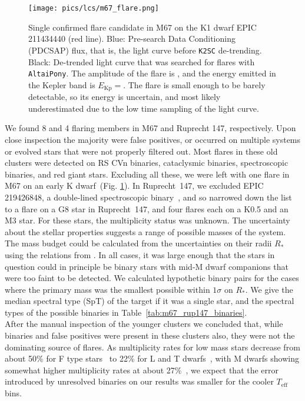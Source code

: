 \documentclass{aa}
\begin{document}
\begin{figure}[ht!]
    \centering
    \texttt{[image: pics/lcs/m67\_flare.png]}
    \caption{Single confirmed flare candidate in M67 on the K1 dwarf EPIC 211434440 (red line). Blue: Pre-search Data Conditioning (PDCSAP) flux, that is, the light curve before \texttt{K2SC} de-trending. Black: De-trended light curve that was searched for flares with \texttt{AltaiPony}. The amplitude of the flare is \unskip, and the energy emitted in the Kepler band is $E_\mathrm{Kp}=$. The flare is small enough to be barely detectable, so its energy is uncertain, and most likely underestimated due to the low time sampling of the light curve.}      
    \label{fig:m67}
\end{figure}
We found 8 and 4 flaring members in M67 and Ruprecht 147, respectively. Upon close inspection the majority were false positives, or occurred on multiple systems or evolved stars that were not properly filtered out. Most flares in these old clusters were detected on RS CVn binaries, cataclysmic binaries, spectroscopic binaries, and red giant stars. Excluding all these, we were left with one flare in M67 on an early K dwarf~(Fig. \ref{fig:m67}). In Ruprecht~147, we excluded EPIC 219426848, a double-lined spectroscopic binary~\citep{curtis2013}, and so narrowed down the list to a flare on a G8 star in Ruprecht~147, and four flares each on a K0.5 and an M3 star. For these stars, the multiplicity status was unknown. The uncertainty about the stellar properties suggests a range of possible masses of the system. The mass budget could be calculated from the uncertainties on their radii $R_*$ using the relations from \citet{eker2018}. In all cases, it was large enough that the stars in question could in principle be binary stars with mid-M dwarf companions that were too faint to be detected. We calculated hypothetic binary pairs for the cases where the primary mass was the smallest possible within $1\sigma$ on $R_*$. We give the median spectral type (SpT) of the target if it was a single star, and the spectral types of the possible binaries in Table~\ref{tab:m67_rup147_binaries}.
\\
After the manual inspection of the younger clusters we concluded that, while binaries and false positives were present in these clusters also, they were not the dominating source of flares. As multiplicity rates for low mass stars decrease from about 50\% for F type stars~\citep{raghavan2010} to 22\% for L and T dwarfs~\citep{duchene2013}, with M dwarfs showing somewhat higher multiplicity rates at about 27\%~\citep{winters2019}, we expect that the error introduced by unresolved binaries on our results was smaller for the cooler $T_\mathrm{eff}$ bins.
\end{document}

